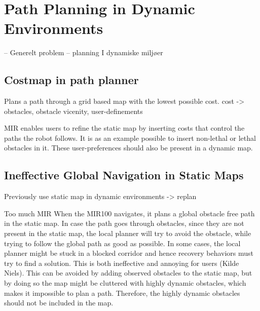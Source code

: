 \section{Path Planning in Dynamic Environments}
–	Generelt problem – planning I dynamiske miljøer


\subsection{Costmap in path planner}
Plans a path through a grid based map with the lowest possible cost. 
cost -> obstacles, obstacle vicenity, user-definements

MIR enables users to refine the static map by inserting costs that control the paths the robot follows. It is as an example possible to insert non-lethal or lethal obstacles in it. These user-preferences should also be present in a dynamic map.

\subsection{Ineffective Global Navigation in Static Maps}
Previously use static map in dynamic environments -> replan


Too much MIR
When the MIR100 navigates, it plans a global obstacle free path in the static map. In case the path goes through obstacles, since they are not present in the static map, the local planner will try to avoid the obstacle, while trying to follow the global path as good as possible. In some cases, the local planner might be stuck in a blocked corridor and hence recovery behaviors must try to find a solution. This is both ineffective and annoying for users (Kilde Niels). This can be avoided by adding observed obstacles to the static map, but by doing so the map might be cluttered with highly dynamic obstacles, which makes it impossible to plan a path. Therefore, the highly dynamic obstacles should not be included in the map. 


